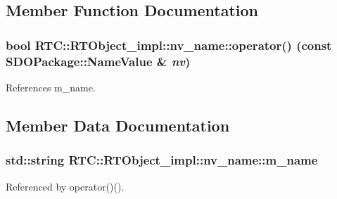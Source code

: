 \subsection{Member Function Documentation}
\subsubsection[{operator()}]{\setlength{\rightskip}{0pt plus 5cm}bool RTC::RTObject\_\-impl::nv\_\-name::operator() (const SDOPackage::NameValue \& {\em nv})\hspace{0.3cm}{\ttfamily  [inline]}}\label{structRTC_1_1RTObject__impl_1_1nv__name_a1a2e166bafde595a715831987437eb69}


References m\_\-name.



\subsection{Member Data Documentation}
\subsubsection[{m\_\-name}]{\setlength{\rightskip}{0pt plus 5cm}std::string {\bf RTC::RTObject\_\-impl::nv\_\-name::m\_\-name}}\label{structRTC_1_1RTObject__impl_1_1nv__name_af575595086bc5ef4260d3a24498457d7}


Referenced by operator()().

